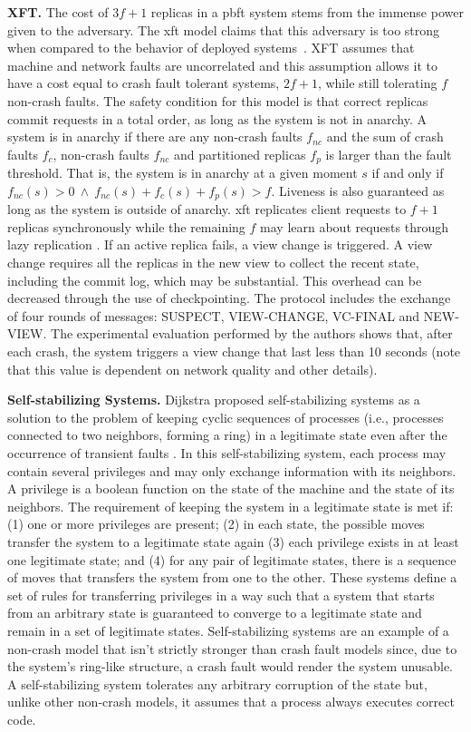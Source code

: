 \textbf{XFT.} The cost of $3f+1$ replicas in a \acrshort{pbft} system stems from the immense power given to the adversary. The \acrfull{xft} model claims that this adversary is too strong when compared to the behavior of deployed systems~\cite{Liu2015}. XFT assumes that machine and network faults are uncorrelated and this assumption allows it to have a cost equal to crash fault tolerant systems, $2f+1$, while still tolerating $f$ non-crash faults. The safety condition for this model is that correct replicas commit requests in a total order, as long as the system is not in anarchy. A system is in anarchy if there are any non-crash faults $f_{nc}$ and the sum of crash faults $f_c$, non-crash faults $f_{nc}$ and partitioned replicas $f_p$ is larger than the fault threshold. That is, the system is in anarchy at a given moment $s$ if and only if $f_{nc}(s) > 0\ \land\ f_{nc}(s)+ f_c(s)+f_p(s) > f$. Liveness is also guaranteed as long as the system is outside of anarchy. \acrshort{xft} replicates client requests to $f+1$ replicas synchronously while the remaining $f$ may learn about requests through lazy replication \cite{Ladin1992}. If an active replica fails, a view change is triggered. A view change requires all the replicas in the new view to collect the recent state, including the commit log, which may be substantial. This overhead can be decreased through the use of checkpointing. The protocol includes the exchange of four rounds of messages: SUSPECT, VIEW-CHANGE, VC-FINAL and NEW-VIEW. The experimental evaluation performed by the authors shows that, after each crash, the system triggers a view change that last less than 10 seconds (note that this value is dependent on network quality and other details). \par
\textbf{Self-stabilizing Systems.} Dijkstra proposed self-stabilizing systems as a solution to the problem of keeping cyclic sequences of processes (i.e., processes connected to two neighbors, forming a ring) in a legitimate state even after the occurrence of transient faults \cite{Dijkstra1974}. In this self-stabilizing system, each process may contain several privileges and may only exchange information with its neighbors. A privilege is a boolean function on the state of the machine and the state of its neighbors. The requirement of keeping the system in a legitimate state is met if: (1) one or more privileges are present; (2) in each state, the possible moves transfer the system to a legitimate state again (3) each privilege exists in at least one legitimate state; and (4) for any pair of legitimate states, there is a sequence of moves that transfers the system from one to the other. These systems define a set of rules for transferring privileges in a way such that a system that starts from an arbitrary state is guaranteed to converge to a legitimate state and remain in a set of legitimate states. Self-stabilizing systems are an example of a non-crash model that isn't strictly stronger than crash fault models since, due to the system's ring-like structure, a crash fault would render the system unusable. A self-stabilizing system tolerates any arbitrary corruption of the state but, unlike other non-crash models, it assumes that a process always executes correct code.\par
